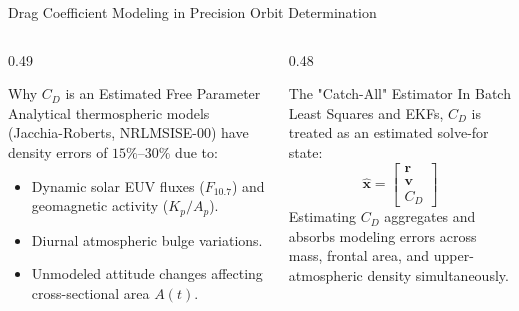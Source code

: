 \documentclass[aspectratio=169,11pt]{beamer}
\begin{document}
\begin{frame}{Drag Coefficient Modeling in Precision Orbit Determination}
    \begin{columns}[t]
        \begin{column}{0.49\textwidth}
            \begin{block}{Why $C_D$ is an Estimated Free Parameter}
                \small
                Analytical thermospheric models (Jacchia-Roberts, NRLMSISE-00) have density errors of \textbf{$15\%\text{--}30\%$} due to:
                \begin{itemize}\setlength{\itemsep}{1pt}
                    \item Dynamic solar EUV fluxes ($F_{10.7}$) and geomagnetic activity ($K_p/A_p$).
                    \item Diurnal atmospheric bulge variations.
                    \item Unmodeled attitude changes affecting cross-sectional area $A(t)$.
                \end{itemize}
            \end{block}
        \end{column}

        \begin{column}{0.48\textwidth}
            \begin{alertblock}{The "Catch-All" Estimator}
                \small
                In Batch Least Squares and EKFs, $C_D$ is treated as an estimated solve-for state:
                {\small
                \begin{equation*}
                    \hat{\mathbf{x}} = \begin{bmatrix} \mathbf{r} \\ \mathbf{v} \\ C_D \end{bmatrix}
                \end{equation*}
                }
                \vspace{-0.2cm}
                Estimating $C_D$ aggregates and absorbs modeling errors across mass, frontal area, and upper-atmospheric density simultaneously.
            \end{alertblock}
        \end{column}
    \end{columns}
\end{frame}
\end{document}
